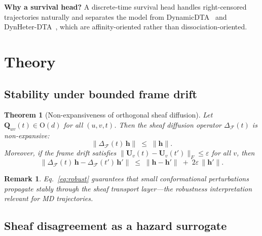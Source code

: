 \documentclass[12pt,a4paper]{article}
\newtheorem{theorem}{Theorem}
\newtheorem{remark}{Remark}
\begin{document}
\begin{claimbox}
\textbf{Why a survival head?}
A discrete-time survival head handles right-censored trajectories naturally
and separates the model from DynamicDTA~\citep{dynamicdta2025} and
DynHeter-DTA~\citep{dynheterdta2025}, which are affinity-oriented rather
than dissociation-oriented.
\end{claimbox}

\section{Theory}
\label{sec:theory}

\subsection{Stability under bounded frame drift}

\begin{theorem}[Non-expansiveness of orthogonal sheaf diffusion]
\label{thm:stability}
Let $\mathbf{Q}_{uv}(t)\in\mathrm{O}(d)$ for all $(u,v,t)$.
Then the sheaf diffusion operator $\Delta_{\mathcal{F}}(t)$ is
non-expansive:
\begin{equation}
  \bigl\|\Delta_{\mathcal{F}}(t)\,\mathbf{h}\bigr\|
  \;\le\;
  \|\mathbf{h}\|.
  \label{eq:nonexp}
\end{equation}
Moreover, if the frame drift satisfies
$\|\mathbf{U}_v(t)-\mathbf{U}_v(t')\|_F\le\varepsilon$ for all $v$,
then
\begin{equation}
  \bigl\|
    \Delta_{\mathcal{F}}(t)\,\mathbf{h}
    -\Delta_{\mathcal{F}}(t')\,\mathbf{h}'
  \bigr\|
  \;\le\;
  \|\mathbf{h}-\mathbf{h}'\|
  \;+\;
  2\varepsilon\,\|\mathbf{h}'\|.
  \label{eq:robust}
\end{equation}
\end{theorem}

\begin{remark}
Eq.~\eqref{eq:robust} guarantees that small conformational perturbations
propagate stably through the sheaf transport layer---the robustness
interpretation relevant for MD trajectories.
\end{remark}

\subsection{Sheaf disagreement as a hazard surrogate}
\end{document}
